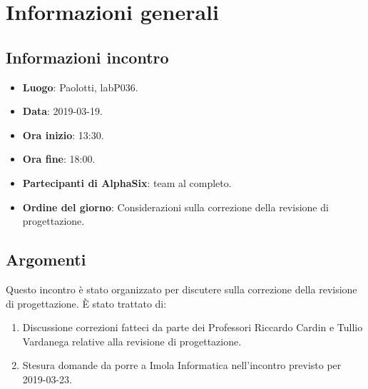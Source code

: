 \newcommand{\documento}{\VI}
\newcommand{\nomedocumentofisico}{VI\_2019-03-19.pdf}
\newcommand{\redazione}{\SG}
\newcommand{\verifica}{\CV}
\newcommand{\approvazione}{\NC}
\newcommand{\versione}{1.0.0}
\newcommand{\uso}{Interno}
\newcommand{\destinateTo}{\gruppo}
\newcommand{\datacreazione}{19 marzo 2019}
\newcommand{\datamodifica}{21 marzo 2019}
\newcommand{\stato}{Approvato}

\def\TABELLE{false}	%
\def\FIGURE{false} 	%






    

    	
    
    \section{Informazioni generali}
		\subsection{Informazioni incontro}
			\begin{itemize}
				\item \textbf{Luogo}: Paolotti, labP036.
				\item \textbf{Data}: 2019-03-19.
				\item \textbf{Ora inizio}: 13:30.
				\item \textbf{Ora fine}: 18:00.
				\item \textbf{Partecipanti di AlphaSix}: team al completo.
				\item \textbf{Ordine del giorno}: Considerazioni sulla correzione della revisione di progettazione.
			\end{itemize}

        \subsection{Argomenti}
            Questo incontro è stato organizzato per discutere sulla correzione della revisione di progettazione. È stato trattato di:
            \begin{enumerate}
                \item Discussione correzioni fatteci da parte dei Professori Riccardo Cardin e Tullio Vardanega relative alla revisione di progettazione.
                \item Stesura domande da porre a Imola Informatica nell'incontro previsto per 2019-03-23.
            \end{enumerate}
            

